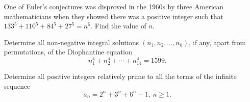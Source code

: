 \documentclass[mast]{lucky}
\begin{document}
\begin{req}[AIME 1989/9]{9}
One of Euler's conjectures was disproved in the 1960s by three American mathematicians when they showed there was a positive integer such that $133^5+110^5+84^5+27^5=n^{5}$. Find the value of $n$.
\end{req}
    
\begin{prob}[USAMO 1979/1]{9}
Determine all non-negative integral solutions $(n_1, n_2, \dots , n_k)$, if any, apart from permutations, of the Diophantine equation
$$n_1^4 + n_2^4 + \cdots + n_{14}^{4} = 1599.$$
\end{prob}

\begin{prob}[IMO 2005/4]{13}
Determine all positive integers relatively prime to all the terms of the infinite sequence
\[a_n=2^n+3^n+6^n -1,\ n\geq 1.\]
\end{prob}
\end{document}
